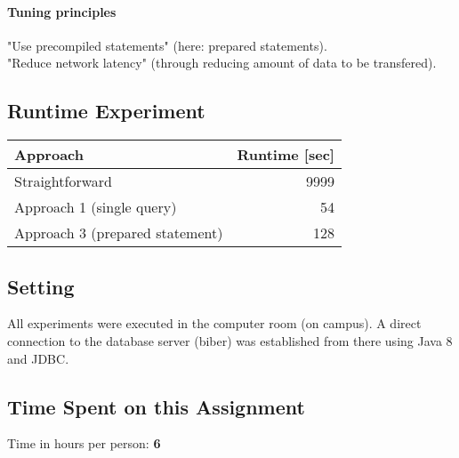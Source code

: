 \documentclass[11pt]{scrartcl}
\begin{document}
  \paragraph{Tuning principles}
  
	"Use precompiled statements" (here: prepared statements).
	\\
  	"Reduce network latency" (through reducing amount of data to be transfered).

  \subsection*{Runtime Experiment}
  \begin{table}[H]
  \begin{tabular}{l|r}
    Approach & Runtime [sec] \\
    \hline
    Straightforward & 9999 \\
    Approach 1 (single query) & 54 \\
    Approach 3 (prepared statement) & 128
  \end{tabular}
  \end{table}

  \bigskip
  
  \subsection*{Setting}
  All experiments were executed in the computer room (on campus). A direct connection to the database server (biber) was established from there using Java 8 and JDBC.
  
  
  \subsection*{Time Spent on this Assignment}

  Time in hours per person: {\textbf 6}
\end{document}
